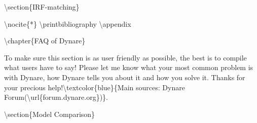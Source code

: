 \documentclass[10pt,math=newtx,citestyle=gb7714-2015,bibstyle=gb7714-2015]{elegantbook}
\begin{document}
	
	
	
	\textbackslash{}section\{IRF-matching\}
	
	
	
	\textbackslash{}nocite\{*\} 
	\textbackslash{}printbibliography
	\textbackslash{}appendix
	
	\textbackslash{}chapter\{FAQ of Dynare\}
	
	To make sure this section is as user friendly as possible, the best is to compile what users have to say! Please let me know what your most common problem is with Dynare, how Dynare tells you about it and how you solve it. Thanks for your precious help!\textbackslash{}textcolor\{blue\}\{Main sources: Dynare Forum(\textbackslash{}url\{forum.dynare.org\})\}.
	
	\textbackslash{}section\{Model Comparison\}
	
\end{document}
